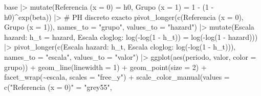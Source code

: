 \documentclass[
  letterpaper,
  DIV=11,
  numbers=noendperiod]{scrartcl}
\newenvironment{Shaded}{\begin{snugshade}}{\end{snugshade}}
\newcommand{\AttributeTok}[1]{\textcolor[rgb]{0.40,0.45,0.13}{#1}}
\newcommand{\CommentTok}[1]{\textcolor[rgb]{0.37,0.37,0.37}{#1}}
\newcommand{\DecValTok}[1]{\textcolor[rgb]{0.68,0.00,0.00}{#1}}
\newcommand{\FunctionTok}[1]{\textcolor[rgb]{0.28,0.35,0.67}{#1}}
\newcommand{\NormalTok}[1]{\textcolor[rgb]{0.00,0.23,0.31}{#1}}
\newcommand{\OtherTok}[1]{\textcolor[rgb]{0.00,0.23,0.31}{#1}}
\newcommand{\SpecialCharTok}[1]{\textcolor[rgb]{0.37,0.37,0.37}{#1}}
\newcommand{\StringTok}[1]{\textcolor[rgb]{0.13,0.47,0.30}{#1}}
\begin{document}
\begin{Shaded}
\begin{Highlighting}[]
\NormalTok{base }\SpecialCharTok{|\textgreater{}}
  \FunctionTok{mutate}\NormalTok{(}\StringTok{\textasciigrave{}}\AttributeTok{Referencia (x = 0)}\StringTok{\textasciigrave{}} \OtherTok{=}\NormalTok{ h0,}
         \StringTok{\textasciigrave{}}\AttributeTok{Grupo (x = 1)}\StringTok{\textasciigrave{}}      \OtherTok{=} \DecValTok{1} \SpecialCharTok{{-}}\NormalTok{ (}\DecValTok{1} \SpecialCharTok{{-}}\NormalTok{ h0)}\SpecialCharTok{\^{}}\FunctionTok{exp}\NormalTok{(beta)) }\SpecialCharTok{|\textgreater{}}   \CommentTok{\# PH discreto exacto}
  \FunctionTok{pivot\_longer}\NormalTok{(}\FunctionTok{c}\NormalTok{(}\StringTok{\textasciigrave{}}\AttributeTok{Referencia (x = 0)}\StringTok{\textasciigrave{}}\NormalTok{, }\StringTok{\textasciigrave{}}\AttributeTok{Grupo (x = 1)}\StringTok{\textasciigrave{}}\NormalTok{),}
               \AttributeTok{names\_to =} \StringTok{"grupo"}\NormalTok{, }\AttributeTok{values\_to =} \StringTok{"hazard"}\NormalTok{) }\SpecialCharTok{|\textgreater{}}
  \FunctionTok{mutate}\NormalTok{(}\StringTok{\textasciigrave{}}\AttributeTok{Escala hazard: h\_t}\StringTok{\textasciigrave{}}                 \OtherTok{=}\NormalTok{ hazard,}
         \StringTok{\textasciigrave{}}\AttributeTok{Escala cloglog: log({-}log(1 {-} h\_t))}\StringTok{\textasciigrave{}} \OtherTok{=} \FunctionTok{log}\NormalTok{(}\SpecialCharTok{{-}}\FunctionTok{log}\NormalTok{(}\DecValTok{1} \SpecialCharTok{{-}}\NormalTok{ hazard))) }\SpecialCharTok{|\textgreater{}}
  \FunctionTok{pivot\_longer}\NormalTok{(}\FunctionTok{c}\NormalTok{(}\StringTok{\textasciigrave{}}\AttributeTok{Escala hazard: h\_t}\StringTok{\textasciigrave{}}\NormalTok{, }\StringTok{\textasciigrave{}}\AttributeTok{Escala cloglog: log({-}log(1 {-} h\_t))}\StringTok{\textasciigrave{}}\NormalTok{),}
               \AttributeTok{names\_to =} \StringTok{"escala"}\NormalTok{, }\AttributeTok{values\_to =} \StringTok{"valor"}\NormalTok{) }\SpecialCharTok{|\textgreater{}}
  \FunctionTok{ggplot}\NormalTok{(}\FunctionTok{aes}\NormalTok{(periodo, valor, }\AttributeTok{color =}\NormalTok{ grupo)) }\SpecialCharTok{+}
  \FunctionTok{geom\_line}\NormalTok{(}\AttributeTok{linewidth =} \DecValTok{1}\NormalTok{) }\SpecialCharTok{+}
  \FunctionTok{geom\_point}\NormalTok{(}\AttributeTok{size =} \DecValTok{2}\NormalTok{) }\SpecialCharTok{+}
  \FunctionTok{facet\_wrap}\NormalTok{(}\SpecialCharTok{\textasciitilde{}}\NormalTok{escala, }\AttributeTok{scales =} \StringTok{"free\_y"}\NormalTok{) }\SpecialCharTok{+}
  \FunctionTok{scale\_color\_manual}\NormalTok{(}\AttributeTok{values =} \FunctionTok{c}\NormalTok{(}\StringTok{"Referencia (x = 0)"} \OtherTok{=} \StringTok{"grey55"}\NormalTok{,}

\end{Highlighting}
\end{Shaded}
\end{document}
